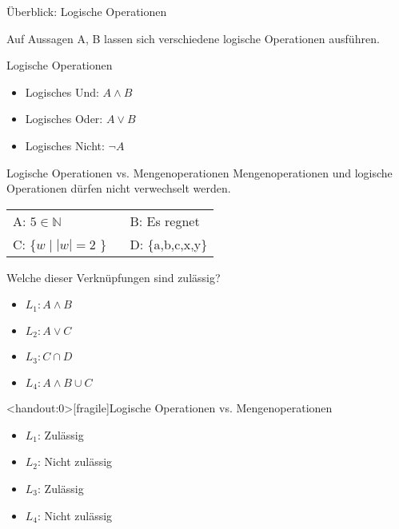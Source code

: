\begin{frame}{Überblick: Logische Operationen}

	Auf \alert{Aussagen} A, B lassen sich verschiedene logische Operationen ausführen.

	\begin{exampleblock}{Logische Operationen}
		\begin{itemize}
			\item Logisches Und: $A \wedge B$
			\item Logisches Oder: $A \vee B$
			\item Logisches Nicht: $\neg A$
		\end{itemize}
	\end{exampleblock}
\end{frame}

{
	\begin{frame}{Logische Operationen vs. Mengenoperationen}
		\alert{Mengenoperationen und logische Operationen dürfen nicht verwechselt werden.}
		\begin{table}[]
			\begin{tabular}{l l}
				A: $5 \in \mathbb{N}$ & B: Es regnet\\
				C: \{$w \mid |w|=2$ \} \ & D: \{a,b,c,x,y\}\\
			\end{tabular}
		\end{table}
		\begin{block}{Welche dieser Verknüpfungen sind zulässig?}
			\begin{itemize}
				\item $L_1: A \wedge B$
				\item $L_2: A \vee C$
				\item $L_3: C \cap D$
				\item $L_4: A \wedge B \cup C$
			\end{itemize}
		\end{block}
	\end{frame}
}

{
	\begin{frame}<handout:0>[fragile]{Logische Operationen vs. Mengenoperationen}
		\begin{itemize}[<+- | alert@+>]
			\item $L_1$: Zulässig
			\item $L_2$: Nicht zulässig
			\item $L_3$: Zulässig
			\item $L_4$: Nicht zulässig
		\end{itemize}
	\end{frame}
}



